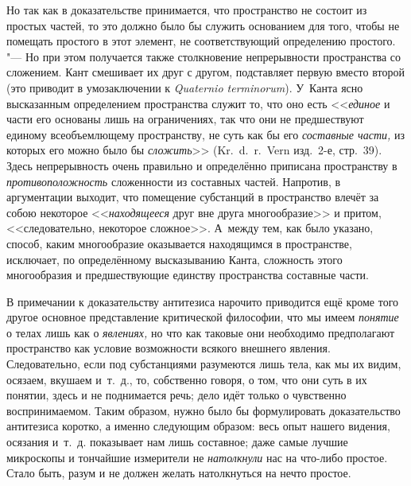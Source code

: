 Но так как в доказательстве принимается, что пространство не состоит из
простых частей, то это должно было бы служить основанием для того, чтобы не
помещать простого в этот элемент, не соответствующий определению простого.
"--- Но при этом получается также столкновение непрерывности пространства со
сложением. Кант смешивает их друг с другом, подставляет первую вместо
второй (это приводит в умозаключении к {\em Quaternio terminorum}). У~Канта
ясно высказанным определением пространства служит то,
что оно есть <<{\em единое} и части его основаны лишь на
ограничениях, так что они не предшествуют единому всеобъемлющему
пространству, не суть как бы его {\em составные части,}
из которых его можно было бы {\em сложить}>> (Kr.~d.~r.~Vern
изд.~2-е, стр.~39). Здесь непрерывность очень правильно и определённо
приписана пространству в {\em противоположность}
сложенности из составных частей. Напротив, в аргументации выходит, что
помещение субстанций в пространство влечёт за собою некоторое
<<{\em находящееся} друг вне друга многообразие>> и
притом, <<следовательно, некоторое сложное>>. А~между тем, как было указано,
способ, каким многообразие оказывается находящимся в пространстве,
исключает, по определённому высказыванию Канта, сложность этого
многообразия и предшествующие единству пространства составные части.

В примечании к доказательству антитезиса нарочито приводится ещё кроме того
другое основное представление критической философии, что мы имеем {\em понятие}
о телах лишь как о {\em явлениях,} но что как таковые они необходимо
предполагают пространство как условие возможности всякого внешнего явления.
Следовательно, если под субстанциями разумеются лишь тела, как мы их видим,
осязаем, вкушаем и~т.~д., то, собственно говоря, о том, что они суть в их
понятии, здесь и не поднимается речь; дело идёт только о чувственно
воспринимаемом. Таким образом, нужно было бы формулировать доказательство
антитезиса коротко, а именно следующим образом: весь опыт нашего видения,
осязания и~т.~д. показывает нам лишь составное; даже самые лучшие микроскопы и
тончайшие измерители не {\em натолкнули} нас на что-либо простое. Стало быть,
разум и не должен желать натолкнуться на нечто простое.

